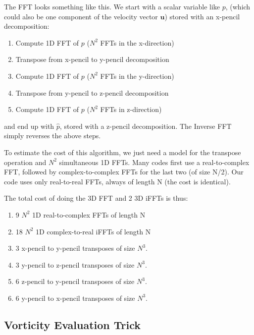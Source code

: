 \documentclass[12pt]{article}
\newcommand{\uv}{\mathbf u}
\begin{document}
The FFT looks something like this.  We start with a scalar variable
like $p$, (which could also be one component of the velocity vector $\uv$)
stored with an x-pencil decomposition:
\begin{enumerate}
\item Compute 1D FFT of $p$ ($N^2$ FFTs in the x-direction)
\item Transpose from x-pencil to y-pencil decomposition
\item Compute 1D FFT of $p$ ($N^2$ FFTs in the y-direction)
\item Transpose from y-pencil to z-pencil decomposition
\item Compute 1D FFT of $p$ ($N^2$ FFTs in z-direction)
\end{enumerate}
and end up with $\hat p$, stored with a z-pencil decomposition.
The Inverse FFT simply reverses the above steps.  

To estimate the cost of this algorithm, we just need a model for the
transpose operation and $N^2$ simultaneous 1D FFTs.  
Many codes first use a real-to-complex FFT, followed by
complex-to-complex FFTs for the last two (of size N/2).  
Our code uses only real-to-real FFTs, always of length N (the cost
is identical).

The total cost of doing the 3D FFT and 2 3D iFFTs is thus:
\begin{enumerate}
\item 9 $N^2$ 1D real-to-complex FFTs of length N
\item 18 $N^2$ 1D complex-to-real iFFTs of length N
\item 3 x-pencil to y-pencil transposes of size $N^3$.  
\item 3 y-pencil to z-pencil transposes of size $N^3$.  
\item 6 z-pencil to y-pencil transposes of size $N^3$.  
\item 6 y-pencil to x-pencil transposes of size $N^3$.  
\end{enumerate}


\subsection{Vorticity Evaluation Trick}
\label{S:vtrick}
\end{document}
